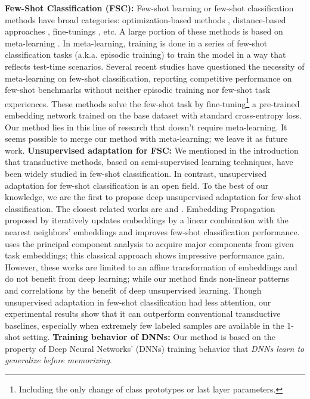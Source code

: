\documentclass{article}
\begin{document}
\textbf{Few-Shot Classification (FSC):}
Few-shot learning or few-shot classification methods have broad categories: optimization-based methods \cite{ravi2016optimization, MAML, LEO}, distance-based approaches \cite{vinyals2016matching, ProtoNet, tadam}, fine-tunings \cite{SimpleShot, tian2020rethinking, transBaseline}, etc.
A large portion of these methods is based on meta-learning \cite{metalearning}.
In meta-learning, training is done in a series of few-shot classification tasks (a.k.a. episodic training) to train the model in a way that reflects test-time scenarios.
Several recent studies \cite{SimpleShot, tian2020rethinking, transBaseline, LaplacianShot, TIM} have questioned the necessity of meta-learning on few-shot classification, reporting competitive performance on few-shot benchmarks without neither episodic training nor few-shot task experiences.
These methods solve the few-shot task by fine-tuning\footnote{Including the only change of class prototypes or last layer parameters.} a pre-trained embedding network trained on the base dataset with standard cross-entropy loss.
Our method lies in this line of research that doesn't require meta-learning. It seems possible to merge our method with meta-learning; we leave it as future work. 
\textbf{Unsupervised adaptation for FSC:}
We mentioned in the introduction that transductive methods, based on semi-supervised learning techniques, have been widely studied in few-shot classification.
In contrast, unsupervised adaptation for few-shot classification is an open field. To the best of our knowledge, we are the first to propose deep unsupervised adaptation for few-shot classification.
The closest related works are \citet{epnet} and \citet{TAFSSL}.
Embedding Propagation proposed by \citet{epnet} iteratively updates embeddings by a linear combination with the nearest neighbors' embeddings and improves few-shot classification performance.
\citet{TAFSSL} uses the principal component analysis to acquire major components from given task embeddings; this classical approach shows impressive performance gain.
However, these works are limited to an affine transformation of embeddings and do not benefit from deep learning; while our method finds non-linear patterns and correlations by the benefit of deep unsupervised learning.
Though unsupervised adaptation in few-shot classification had less attention, our experimental results show that it can outperform conventional transductive baselines, especially when extremely few labeled samples are available in the 1-shot setting. 
\textbf{Training behavior of DNNs:}
Our method is based on the property of Deep Neural Networks' (DNNs) training behavior that  \textit{DNNs learn to generalize before memorizing}.
\end{document}
